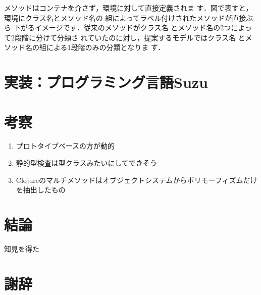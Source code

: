 \documentclass[a4paper,11pt,dvipdfmx]{jreport}
\begin{document}
メソッドはコンテナを介さず，環境に対して直接定義されま
す．図で表すと，環境にクラス名とメソッド名の
組によってラベル付けされたメソッドが直接ぶら
下がるイメージです．従来のメソッドがクラス名
とメソッド名の2つによって2段階に分けて分類さ
れていたのに対し，提案するモデルではクラス名
とメソッド名の組による1段階のみの分類となりま
す．


\chapter{実装：プログラミング言語Suzu}

\chapter{考察}

\begin{enumerate}
\item プロトタイプベースの方が動的
\item 静的型検査は型クラスみたいにしてできそう
\item Clojureのマルチメソッドはオブジェクトシステムからポリモーフィズムだけを抽出したもの
\end{enumerate}

\chapter{結論}

知見を得た

\chapter*{謝辞}

\newpage

\renewcommand{\bibname}{参考文献}




%
%
\end{document}
